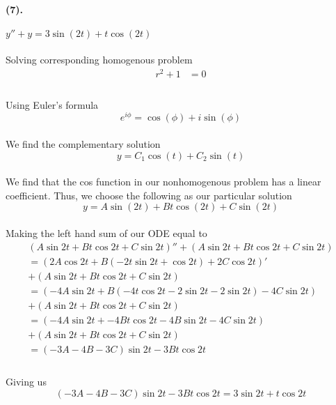 \documentclass{article}
\begin{document}
\paragraph{(7).}$y''+y=3\sin(2t)+t\cos(2t)$
\paragraph{}Solving corresponding homogenous problem
\begin{align*}
    r^2 + 1 &= 0\\
\end{align*}
\paragraph{}Using Euler's formula
\[
    e^{i\phi} = \cos(\phi) + i\sin(\phi) 
\]
\paragraph{}We find the complementary solution
\[
    y = C_1\cos(t) + C_2\sin(t) 
\]
\paragraph{}We find that the cos function in our nonhomogenous problem has a linear coefficient. Thus, we
choose the following as our particular solution
\[
  y = A\sin(2t) + Bt\cos(2t) + C\sin(2t)
\]
\paragraph{}Making the left hand sum of our ODE equal to
\begin{align*}
    (A \sin 2t + Bt \cos 2t + C \sin 2t)'' + (A \sin 2t + Bt \cos 2t + C \sin 2t)\\
    = (2A \cos 2t + B(-2t \sin 2t + \cos 2t) + 2C \cos 2t)' \\+ (A \sin 2t + Bt \cos 2t + C \sin 2t)\\
    =(-4A \sin 2t + B(-4t \cos 2t -2 \sin 2t - 2\sin 2t) - 4C \sin 2t) \\+(A \sin 2t + Bt \cos 2t + C \sin 2t)\\
    =(-4A \sin 2t + -4Bt \cos 2t -4B \sin 2t - 4C \sin 2t) \\+(A \sin 2t + Bt \cos 2t + C \sin 2t)\\
    =(-3A -4B - 3C)\sin 2t -3Bt \cos 2t\\
\end{align*}
\paragraph{}Giving us
\[
    (-3A - 4B -3C)\sin2t - 3Bt\cos2t = 3\sin2t + t\cos2t
\]
\end{document}
